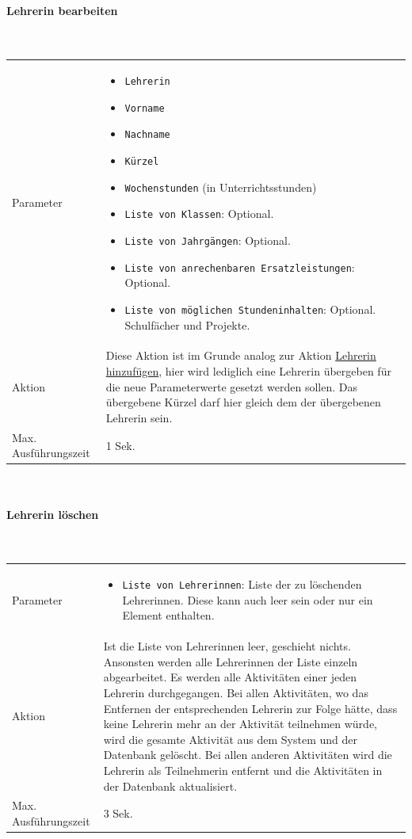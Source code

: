 \documentclass[fontsize=12pt,paper=a4,twoside]{scrartcl}
\begin{document}
\paragraph{Lehrerin bearbeiten}\mbox{}\\

\begin{tabularx}{\textwidth}{p{4cm}X}
Parameter & \begin{itemize}[itemsep=0pt, leftmargin = 0.5cm]
			\item \texttt{Lehrerin}
			\item \texttt{Vorname}
			\item \texttt{Nachname}
			\item \texttt{Kürzel}
			\item \texttt{Wochenstunden} (in Unterrichtsstunden)
			\item \texttt{Liste von Klassen}: Optional. 
			\item \texttt{Liste von Jahrgängen}: Optional. 
			\item \texttt{Liste von anrechenbaren Ersatzleistungen}: Optional.
			\item \texttt{Liste von möglichen Stundeninhalten}: Optional. Schulfächer und Projekte.
			\end{itemize}\\
Aktion & Diese Aktion ist im Grunde analog zur Aktion \hyperlink{par:LehrerinHinzufuegen}{Lehrerin hinzufügen}, hier wird lediglich eine Lehrerin übergeben für die neue Parameterwerte gesetzt werden sollen. Das übergebene Kürzel darf hier gleich dem der übergebenen Lehrerin sein.\\
Max. Ausführungszeit & 1 Sek.
\end{tabularx}\\

\paragraph{Lehrerin löschen}\mbox{}\\

\begin{tabularx}{\textwidth}{p{4cm}X}
Parameter & \begin{itemize}[itemsep=0pt, leftmargin = 0.5cm]
			\item \texttt{Liste von Lehrerinnen}: Liste der zu löschenden Lehrerinnen. Diese kann auch leer sein oder nur ein Element enthalten.
			\end{itemize}\\
Aktion & Ist die Liste von Lehrerinnen leer, geschieht nichts. Ansonsten werden alle Lehrerinnen der Liste einzeln abgearbeitet. Es werden alle Aktivitäten einer jeden Lehrerin durchgegangen. Bei allen Aktivitäten, wo das Entfernen der entsprechenden Lehrerin zur Folge hätte, dass keine Lehrerin mehr an der Aktivität teilnehmen würde, wird die gesamte Aktivität aus dem System und der Datenbank gelöscht. Bei allen anderen Aktivitäten wird die Lehrerin als Teilnehmerin entfernt und die Aktivitäten in der Datenbank aktualisiert. \\
Max. Ausführungszeit & 3 Sek. 
\end{tabularx}\\
\end{document}
